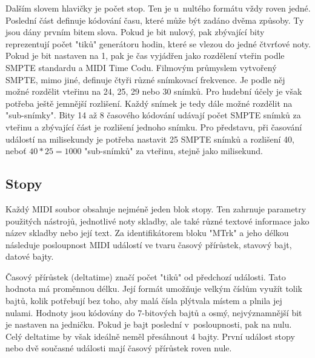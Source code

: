Dalším slovem hlavičky je počet stop.
Ten je u~nultého formátu vždy roven jedné.
Poslední část definuje kódování času, 
které může být zadáno dvěma způsoby.
Ty jsou dány prvním bitem slova.
Pokud je bit nulový, 
pak zbývající bity reprezentují počet "tiků" generátoru hodin, 
které se vlezou do jedné čtvrťové noty.
Pokud je bit nastaven na 1, 
pak je čas vyjádřen jako rozdělení vteřin podle SMPTE standardu
a MIDI Time Codu.
\cite{Back_SMF_Specif}
Filmovým průmyslem vytvořený SMPTE, mimo jiné, 
definuje čtyři různé snímkovací frekvence.
Je podle něj možné rozdělit vteřinu na 24, 25, 29 nebo 30 snímků.
Pro hudební účely je však potřeba ještě jemnější rozlišení.
Každý snímek je tedy dále možné rozdělit na "sub-snímky".
\cite{Glatt_aboutMIDIFiles}
Bity 14 až 8 časového kódování udávají počet SMPTE snímků za vteřinu 
a zbývající část je rozlišení jednoho snímku.
Pro představu,
při časování událostí na milisekundy je potřeba nastavit 25 SMPTE snímků
a rozlišení 40, neboť $ 40 * 25 = 1000 $ "sub-snímků" za vteřinu, 
stejně jako milisekund. 
\cite{Back_SMF_Specif}
\par

\subsection{Stopy}
Každý MIDI soubor obsahuje nejméně jeden blok stopy.
Ten zahrnuje parametry použitých nástrojů, jednotlivé noty skladby, 
ale také různé textové informace jako název skladby nebo její text.
Za identifikátorem bloku "MTrk" a jeho délkou 
následuje posloupnost MIDI událostí
ve tvaru časový přírůstek, stavový bajt, datové bajty.
\cite{Back_SMF_Specif}
\par

Časový přírůstek (deltatime) značí počet "tiků" od předchozí události.
Tato hodnota má proměnnou délku.
Její formát umožňuje velkým číslům využít tolik bajtů, 
kolik potřebují bez toho,
aby malá čísla plýtvala místem a plnila jej nulami.
Hodnoty jsou kódovány do 7-bitových bajtů 
a osmý, nejvýznamnější bit je nastaven na jedničku.
Pokud je bajt poslední v~posloupnosti, pak na nulu.
Celý deltatime by však ideálně neměl přesáhnout 4 bajty.
\cite{Glatt_aboutMIDIFiles}
První událost stopy nebo dvě současné události 
mají časový přírůstek roven nule.
\cite{Back_SMF_Specif}
\par

